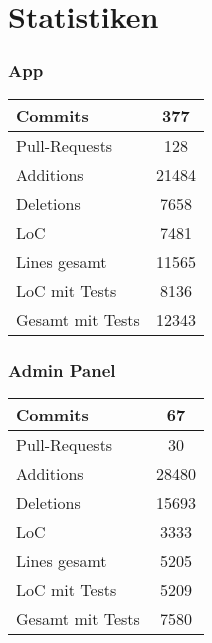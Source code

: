 \section{Statistiken}

\begin{frame}\frametitle{App}
    \begin{minipage}{.3\textwidth}
        \begin{tabular}{l|c}
            Commits & 377 \\
            \hline
            Pull-Requests & 128 \\
            \hline
            Additions & 21484\\
            \hline
            Deletions & 7658 \\
            \hline
            LoC & 7481 \\
            \hline
            Lines gesamt & 11565 \\
            \hline
            LoC mit Tests & 8136 \\
            \hline
            Gesamt mit Tests & 12343
        \end{tabular}
    \end{minipage}
    \begin{minipage}{.69\textwidth}
    \end{minipage}
\end{frame}

\begin{frame}\frametitle{Admin Panel}
    \begin{minipage}{.3\textwidth}
        \begin{tabular}{l|c}
            Commits & 67 \\
            \hline
            Pull-Requests & 30 \\
            \hline
            Additions & 28480\\
            \hline
            Deletions & 15693 \\
            \hline
            LoC & 3333 \\
            \hline
            Lines gesamt & 5205 \\
            \hline
            LoC mit Tests & 5209 \\
            \hline
            Gesamt mit Tests & 7580
        \end{tabular}
    \end{minipage}
    \begin{minipage}{.69\textwidth}
    \end{minipage}
\end{frame}

